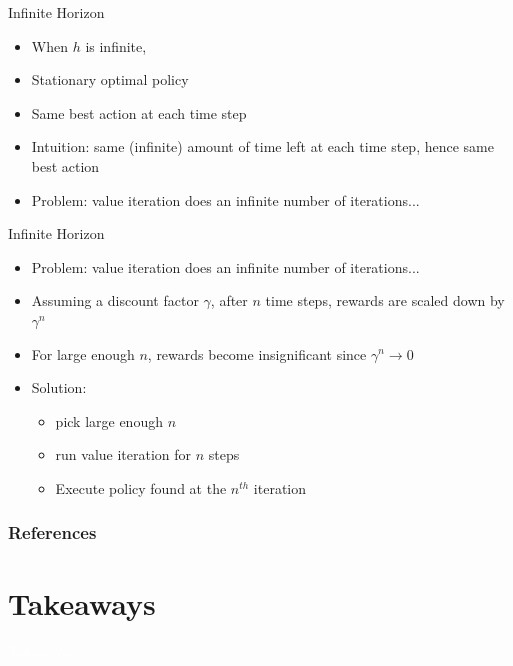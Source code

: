 \documentclass[11pt,table]{beamer}
\begin{document}
\begin{frame}{Infinite Horizon}

\begin{itemize}
\item When $h$ is infinite,
\item \textcolor{red1}{Stationary} optimal policy
\item Same best action at each time step
\item Intuition: same (infinite) amount of time left at each  time step, hence same best action
\item \textcolor{red1}{Problem}: value iteration does an infinite number of  iterations...
\end{itemize}
    
\end{frame}
\begin{frame}{Infinite Horizon}

    \begin{itemize}
\item \textcolor{red1}{Problem}: value iteration does an infinite number of  iterations...
\item Assuming a discount factor $\gamma$, after $n$ time steps,  rewards are scaled down by $\gamma^n$
\item For large enough $n$, rewards become insignificant  since $\gamma^n\rightarrow0$
\item Solution:
 \begin{itemize}
     \item pick large enough $n$
\item run value iteration for $n$ steps
\item Execute policy found at the $n^{th}$ iteration
 
 \end{itemize}
    \end{itemize}
    
\end{frame}


\begin{frame}[t,allowframebreaks
]%
\frametitle{References}
\small

\end{frame}
\section{Takeaways}
{
\begin{frame}
\centering
\Huge
\textcolor{white}{Takeaways}
\thispagestyle{empty}
\end{frame}
}
\end{document}
